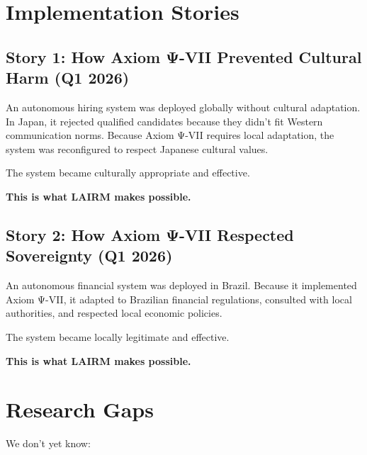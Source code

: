\vspace{0.5cm}

\section{Implementation Stories}

\subsection{Story 1: How Axiom Ψ-VII Prevented Cultural Harm (Q1 2026)}

An autonomous hiring system was deployed globally without cultural adaptation. In Japan, it rejected qualified candidates because they didn't fit Western communication norms. Because Axiom Ψ-VII requires local adaptation, the system was reconfigured to respect Japanese cultural values.

The system became culturally appropriate and effective.

\textbf{This is what LAIRM makes possible.}

\subsection{Story 2: How Axiom Ψ-VII Respected Sovereignty (Q1 2026)}

An autonomous financial system was deployed in Brazil. Because it implemented Axiom Ψ-VII, it adapted to Brazilian financial regulations, consulted with local authorities, and respected local economic policies.

The system became locally legitimate and effective.

\textbf{This is what LAIRM makes possible.}

\vspace{0.5cm}

\section{Research Gaps}

We don't yet know:

